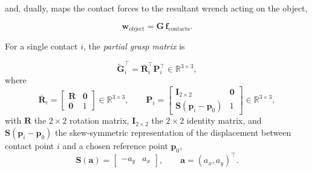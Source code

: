 and, dually, maps the contact forces to the resultant wrench acting on the
object,

\begin{equation}
    \boldsymbol{w}_{\text{object}} = \boldsymbol{G}\, \boldsymbol{f}_{\text{contacts}} .
    \label{eq:grasp-matrix-wrench}
\end{equation}

For a single contact $i$, the \emph{partial grasp matrix} is

\begin{equation}
    \tilde{\boldsymbol{G}}_i^\top = \bar{\boldsymbol{R}}_i^\top \boldsymbol{P}_i^\top \in \mathbb{R}^{3 \times 3} ,
    \label{eq:partial-grasp-matrix}
\end{equation}
where
\begin{equation}
    \bar{\boldsymbol{R}}_i =
    \begin{bmatrix}
        \boldsymbol{R} & \boldsymbol{0} \\
        \boldsymbol{0} & 1
    \end{bmatrix} \in \mathbb{R}^{3\times3},
    \qquad
    \boldsymbol{P}_i =
    \begin{bmatrix}
        \boldsymbol{I}_{2\times2} & \boldsymbol{0} \\
        \boldsymbol{S}(\boldsymbol{p}_i - \boldsymbol{p}_0) & 1
    \end{bmatrix} \in \mathbb{R}^{3\times3} ,
    \label{eq:Rbar-P}
\end{equation}
with $\boldsymbol{R}$ the $2\times2$ rotation matrix, $\boldsymbol{I}_{2\times2}$ the $2\times2$
identity matrix, and $\boldsymbol{S}(\boldsymbol{p}_i - \boldsymbol{p}_0)$ the skew-symmetric
representation of the displacement between contact point $i$ and a chosen
reference point $\boldsymbol{p}_0$,
\begin{equation}
    \boldsymbol{S}(\boldsymbol{a}) = \begin{bmatrix} -a_y & a_x \end{bmatrix}, \qquad \boldsymbol{a} = (a_x, a_y)^\top .
    \label{eq:skew-2d}
\end{equation}

